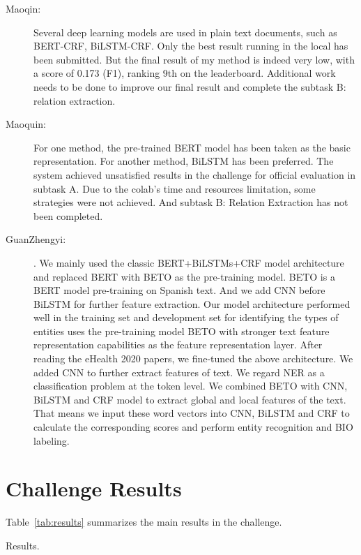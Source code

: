 \documentclass[a4paper,11pt,twocolumn,twoside]{article}
\begin{document}
\begin{description}
  \item[Maoqin:]  Several deep learning models are used in plain text documents, such as
  BERT-CRF, BiLSTM-CRF. Only the best result running in the local has been submitted. But the final
  result of my method is indeed very low, with a score of 0.173 (F1), ranking 9th on the leaderboard.
  Additional work needs to be done to improve our final result and complete the subtask B: relation
  extraction.

  \item[Maoquin:] For one method, the pre-trained BERT model has been taken as the basic representation.
  For another method, BiLSTM has been preferred. The system achieved unsatisfied results in the
  challenge for official evaluation in subtask A. Due to the colab’s time and resources limitation,
  some strategies were not achieved. And subtask B: Relation Extraction has not been completed.
  
  \item [GuanZhengyi:] . We mainly used the classic BERT+BiLSTMs+CRF model architecture and replaced BERT
  with BETO as the pre-training model. BETO is a BERT model pre-training on Spanish text. And we
  add CNN before BiLSTM for further feature extraction. Our model architecture performed well in the
  training set and development set for identifying the types of entities
  uses the pre-training model BETO with stronger text feature
  representation capabilities as the feature representation layer. After reading the eHealth 2020
  papers, we fine-tuned the above architecture. We added CNN to further extract features of
  text. We regard NER as a classification problem at the token level. We combined BETO with
  CNN, BiLSTM and CRF model to extract global and local features of the text. That means we
  input these word vectors into CNN, BiLSTM and CRF to calculate the corresponding scores and
  perform entity recognition and BIO labeling.
\end{description}

\section{Challenge Results}\label{sec:results}

Table~\ref{tab:results} summarizes the main results in the challenge.

\begin{table}
  \caption{Results.\label{tab:results}}
\end{table}
\end{document}
